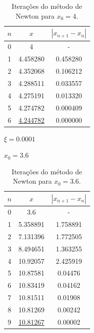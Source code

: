 \begin{example}
\begin{enumerar}
\begin{table}[htp]
\footnotesize
	\centering		
		\begin{tabular}{|c|c|c|}
		\hline		
		\textbf{$n$} & \textbf{$x$} & \textbf{$\displaystyle | x_{n+1} - x_{n} |$}\\
		\hline \hline 
		0 & 4 & -\\
		\hline 
		1 & 4.458280 & 0.458280\\
		\hline 
		2 & 4.352068 & 0.106212\\
		\hline
		3 & 4.288511 & 0.033557\\
		\hline
		4 & 4.275191 & 0.013320\\
		\hline
		5 & 4.274782 & 0.000409\\
		\hline
		6 & \underline{4.244782} & 0.000000\\
		\hline
		\end{tabular}
	\caption{Iterações do método de Newton para $x_{0} = 4$.}
	\label{tab:newton3}
\end{table}

\item $\xi = 0.0001$

$x_{0} = 3.6$

\begin{table}[htp]
\footnotesize
	\centering		
		\begin{tabular}{|c|c|c|}
		\hline		
		\textbf{$n$} & \textbf{$x$} & \textbf{$\displaystyle | x_{n+1} - x_{n} |$}\\
		\hline \hline 
		0 & 3.6 & -\\
		\hline 
		1 & 5.358891 & 1.758891\\
		\hline 
		2 & 7.131396 & 1.772505\\
		\hline
		3 & 8.494651 & 1.363255\\
		\hline
		4 & 10.92057 & 2.425919\\
		\hline
		5 & 10.87581 & 0.04476\\
		\hline
		6 & 10.83419 & 0.04162\\
		\hline
		7 & 10.81511 & 0.01908\\
		\hline
		8 & 10.81269 & 0.00242\\
		\hline
		9 & \underline{10.81267} & 0.00002\\
		\hline
		\end{tabular}
	\caption{Iterações do método de Newton para $x_{0} = 3.6$.}
	\label{tab:newton4}
\end{table}

\end{enumerar}

\end{example}


